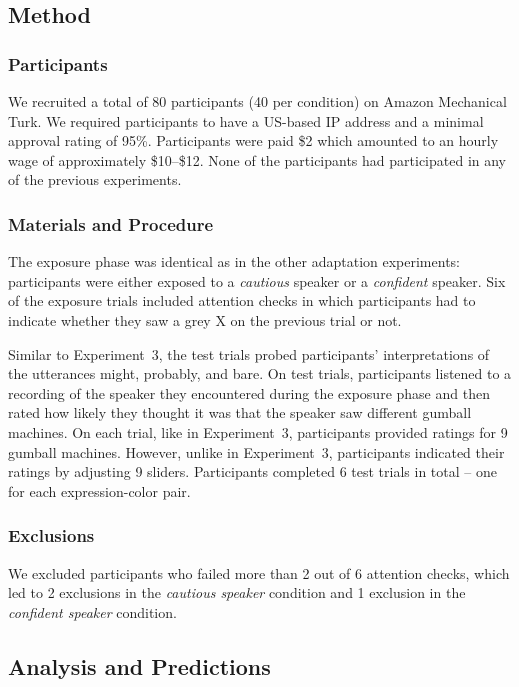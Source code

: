 \documentclass[man, floatsintext]{apa6}
\begin{document}
\subsection{Method}
\subsubsection{Participants}

We recruited a total of 80 participants (40 per condition) on Amazon Mechanical Turk. We required participants to have a US-based IP address and a minimal approval rating of 95\%. Participants were paid \$2 which amounted to an hourly wage of approximately \$10--\$12. None of the participants had participated in any of the previous experiments. 

\subsubsection{Materials and Procedure}

The exposure phase was identical as in the other adaptation experiments: participants were either exposed to a 
\textit{cautious} speaker or a \textit{confident} speaker. Six of the exposure trials included attention checks in which
participants had to indicate whether they saw a grey X on the previous trial or not.

Similar to Experiment~3, the test trials probed participants'
interpretations of the utterances {\sc might}, {\sc probably}, and {\sc bare}. On test trials, participants listened
to a recording of the speaker they encountered during the exposure phase and then rated how likely they
thought it was that the speaker saw different gumball machines. On each trial, like in Experiment~3, participants
provided ratings for 9 gumball machines. However, unlike in Experiment~3, participants indicated their ratings
by adjusting 9 sliders. Participants completed 6 test trials in total -- one for each expression-color pair.

\subsubsection{Exclusions}

We excluded participants who failed more than 2 out of 6 attention checks, which led to 2 exclusions in the \emph{cautious speaker} condition and 1 exclusion in the \emph{confident speaker} condition.


\subsection{Analysis and Predictions}
\end{document}
